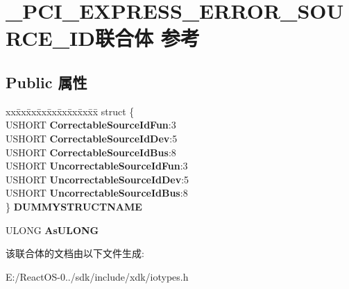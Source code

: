 \hypertarget{union___p_c_i___e_x_p_r_e_s_s___e_r_r_o_r___s_o_u_r_c_e___i_d}{}\section{\+\_\+\+P\+C\+I\+\_\+\+E\+X\+P\+R\+E\+S\+S\+\_\+\+E\+R\+R\+O\+R\+\_\+\+S\+O\+U\+R\+C\+E\+\_\+\+I\+D联合体 参考}
\label{union___p_c_i___e_x_p_r_e_s_s___e_r_r_o_r___s_o_u_r_c_e___i_d}
\subsection*{Public 属性}
\begin{DoxyCompactItemize}
\item 
\mbox{\label{union___p_c_i___e_x_p_r_e_s_s___e_r_r_o_r___s_o_u_r_c_e___i_d_a7a4618b57381dc9c4e3428cde106f742}} 
\begin{tabbing}
xx\=xx\=xx\=xx\=xx\=xx\=xx\=xx\=xx\=\kill
struct \{\\
\>USHORT {\bfseries CorrectableSourceIdFun}:3\\
\>USHORT {\bfseries CorrectableSourceIdDev}:5\\
\>USHORT {\bfseries CorrectableSourceIdBus}:8\\
\>USHORT {\bfseries UncorrectableSourceIdFun}:3\\
\>USHORT {\bfseries UncorrectableSourceIdDev}:5\\
\>USHORT {\bfseries UncorrectableSourceIdBus}:8\\
\} {\bfseries DUMMYSTRUCTNAME}\\

\end{tabbing}\item 
\mbox{\label{union___p_c_i___e_x_p_r_e_s_s___e_r_r_o_r___s_o_u_r_c_e___i_d_a416efc907fbaf0b3e356faeeacca9840}} 
U\+L\+O\+NG {\bfseries As\+U\+L\+O\+NG}
\end{DoxyCompactItemize}


该联合体的文档由以下文件生成\+:\begin{DoxyCompactItemize}
\item 
E\+:/\+React\+O\+S-\/0../sdk/include/xdk/iotypes.\+h\end{DoxyCompactItemize}
